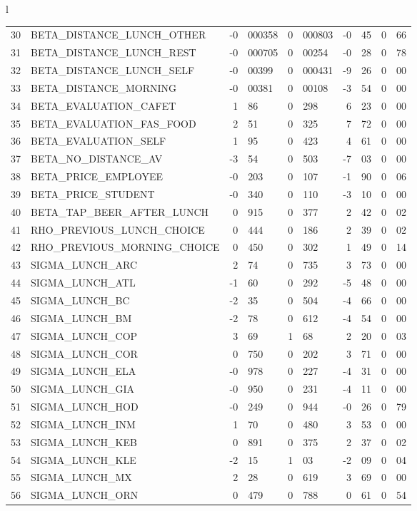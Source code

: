 \begin{tabular}{l}
\begin{tabular}{rlr@{.}lr@{.}lr@{.}lr@{.}l}
30 & BETA_DISTANCE_LUNCH_OTHER & -0&000358 & 0&000803 & -0&45 & 0&66\\
31 & BETA_DISTANCE_LUNCH_REST & -0&000705 & 0&00254 & -0&28 & 0&78\\
32 & BETA_DISTANCE_LUNCH_SELF & -0&00399 & 0&000431 & -9&26 & 0&00\\
33 & BETA_DISTANCE_MORNING & -0&00381 & 0&00108 & -3&54 & 0&00\\
34 & BETA_EVALUATION_CAFET & 1&86 & 0&298 & 6&23 & 0&00\\
35 & BETA_EVALUATION_FAS_FOOD & 2&51 & 0&325 & 7&72 & 0&00\\
36 & BETA_EVALUATION_SELF & 1&95 & 0&423 & 4&61 & 0&00\\
37 & BETA_NO_DISTANCE_AV & -3&54 & 0&503 & -7&03 & 0&00\\
38 & BETA_PRICE_EMPLOYEE & -0&203 & 0&107 & -1&90 & 0&06\\
39 & BETA_PRICE_STUDENT & -0&340 & 0&110 & -3&10 & 0&00\\
40 & BETA_TAP_BEER_AFTER_LUNCH & 0&915 & 0&377 & 2&42 & 0&02\\
41 & RHO_PREVIOUS_LUNCH_CHOICE & 0&444 & 0&186 & 2&39 & 0&02\\
42 & RHO_PREVIOUS_MORNING_CHOICE & 0&450 & 0&302 & 1&49 & 0&14\\
43 & SIGMA_LUNCH_ARC & 2&74 & 0&735 & 3&73 & 0&00\\
44 & SIGMA_LUNCH_ATL  & -1&60 & 0&292 & -5&48 & 0&00\\
45 & SIGMA_LUNCH_BC & -2&35 & 0&504 & -4&66 & 0&00\\
46 & SIGMA_LUNCH_BM & -2&78 & 0&612 & -4&54 & 0&00\\
47 & SIGMA_LUNCH_COP & 3&69 & 1&68 & 2&20 & 0&03\\
48 & SIGMA_LUNCH_COR  & 0&750 & 0&202 & 3&71 & 0&00\\
49 & SIGMA_LUNCH_ELA & -0&978 & 0&227 & -4&31 & 0&00\\
50 & SIGMA_LUNCH_GIA  & -0&950 & 0&231 & -4&11 & 0&00\\
51 & SIGMA_LUNCH_HOD  & -0&249 & 0&944 & -0&26 & 0&79\\
52 & SIGMA_LUNCH_INM  & 1&70 & 0&480 & 3&53 & 0&00\\
53 & SIGMA_LUNCH_KEB  & 0&891 & 0&375 & 2&37 & 0&02\\
54 & SIGMA_LUNCH_KLE & -2&15 & 1&03 & -2&09 & 0&04\\
55 & SIGMA_LUNCH_MX  & 2&28 & 0&619 & 3&69 & 0&00\\
56 & SIGMA_LUNCH_ORN  & 0&479 & 0&788 & 0&61 & 0&54\\

\end{tabular}
\end{tabular}
